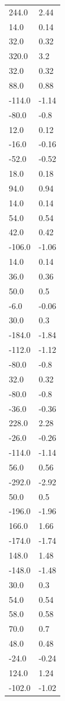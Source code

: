 \begin{longtable}{ll}
244.0 & 2.44 \\
14.0 & 0.14 \\
32.0 & 0.32 \\
320.0 & 3.2 \\
32.0 & 0.32 \\
88.0 & 0.88 \\
-114.0 & -1.14 \\
-80.0 & -0.8 \\
12.0 & 0.12 \\
-16.0 & -0.16 \\
-52.0 & -0.52 \\
18.0 & 0.18 \\
94.0 & 0.94 \\
14.0 & 0.14 \\
54.0 & 0.54 \\
42.0 & 0.42 \\
-106.0 & -1.06 \\
14.0 & 0.14 \\
36.0 & 0.36 \\
50.0 & 0.5 \\
-6.0 & -0.06 \\
30.0 & 0.3 \\
-184.0 & -1.84 \\
-112.0 & -1.12 \\
-80.0 & -0.8 \\
32.0 & 0.32 \\
-80.0 & -0.8 \\
-36.0 & -0.36 \\
228.0 & 2.28 \\
-26.0 & -0.26 \\
-114.0 & -1.14 \\
56.0 & 0.56 \\
-292.0 & -2.92 \\
50.0 & 0.5 \\
-196.0 & -1.96 \\
166.0 & 1.66 \\
-174.0 & -1.74 \\
148.0 & 1.48 \\
-148.0 & -1.48 \\
30.0 & 0.3 \\
54.0 & 0.54 \\
58.0 & 0.58 \\
70.0 & 0.7 \\
48.0 & 0.48 \\
-24.0 & -0.24 \\
124.0 & 1.24 \\
-102.0 & -1.02 \\

\end{longtable}
